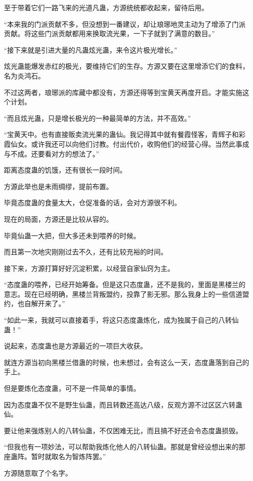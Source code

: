 \begin{this_body}
至于带着它们一路飞来的光道凡蛊，方源统统都收起来，留待后用。

“本来我的门派贡献不多，但没想到一番建议，却让琅琊地灵主动为了增添了门派贡献。将这些门派贡献都用来换取流光果，一下子就到了满意的数目。”

“接下来就是引进大量的凡蛊炫光蛊，来令这片极光增长。”

炫光蛊能爆发赤红的极光，要维持它们的生存。方源又要在这里增添它们的食料，名为炎鸿石。

不过这两者，琅琊派的库藏中都没有，方源还得等到宝黄天再度开启。才能实施这个计划。

“而且炫光蛊，只是增长极光的一种最简单的方法，并不高效。”

“宝黄天中。也有直接贩卖流光果的蛊仙。我记得其中就有餐霞怪客，青辉子和彩霞仙女。或许我还可以向他们讨教。付出代价，收购他们的经营心得。当然此事成与不成。还要看对方的想法了。”

距离态度蛊的饥饿，还有很长一段时间。

方源此举也是未雨绸缪，提前布置。

毕竟态度蛊的食量太大，仓促准备的话，会对方源很不利。

现在的局面，方源还是比较从容的。

毕竟仙蛊一大把，但大多还未到喂养的时候。

而且第一次地灾刚刚过去不久，还有比较充裕的时间。

接下来，方源打算好好沉淀积累，以经营自家仙窍为主。

“态度蛊的喂养，已经开始筹备。但是这只态度蛊，还不是我的，里面是黑楼兰的意志。现在已经明确，黑楼兰背叛盟约，投靠了影无邪。那么我身上的一些信道盟约，也自解开来了。”

“如此一来，我就可以直接着手，将这只态度蛊炼化，成为独属于自己的八转仙蛊！”

说起来，态度蛊也是方源最近的一项巨大收获。

就连方源当初向黑楼兰借蛊的时候，也未想过，会有这么一天，态度蛊落到自己的手上。

但是要炼化态度蛊，可不是一件简单的事情。

因为态度蛊不仅不是野生仙蛊，而且转数还高达八级，反观方源不过区区六转蛊仙。

要让他来强炼别人的八转仙蛊，不仅困难无比，而且搞不好还会令态度蛊损毁。

“但我也有一项妙法，可以帮助我炼化他人的八转仙蛊。那就是曾经设想出来的那座蛊阵。暂时就取名为智炼阵罢。”

方源随意取了个名字。


\end{this_body}
